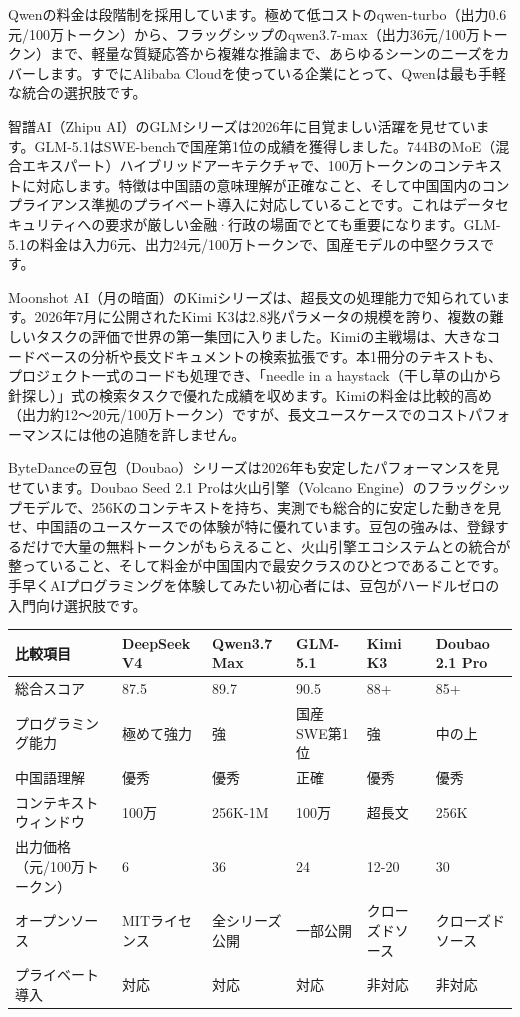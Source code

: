 Qwenの料金は段階制を採用しています。極めて低コストのqwen-turbo（出力0.6元/100万トークン）から、フラッグシップのqwen3.7-max（出力36元/100万トークン）まで、軽量な質疑応答から複雑な推論まで、あらゆるシーンのニーズをカバーします。すでにAlibaba Cloudを使っている企業にとって、Qwenは最も手軽な統合の選択肢です。


智譜AI（Zhipu AI）のGLMシリーズは2026年に目覚ましい活躍を見せています。GLM-5.1はSWE-benchで国産第1位の成績を獲得しました。744BのMoE（混合エキスパート）ハイブリッドアーキテクチャで、100万トークンのコンテキストに対応します。特徴は中国語の意味理解が正確なこと、そして中国国内のコンプライアンス準拠のプライベート導入に対応していることです。これはデータセキュリティへの要求が厳しい金融·行政の場面でとても重要になります。GLM-5.1の料金は入力6元、出力24元/100万トークンで、国産モデルの中堅クラスです。


Moonshot AI（月の暗面）のKimiシリーズは、超長文の処理能力で知られています。2026年7月に公開されたKimi K3は2.8兆パラメータの規模を誇り、複数の難しいタスクの評価で世界の第一集団に入りました。Kimiの主戦場は、大きなコードベースの分析や長文ドキュメントの検索拡張です。本1冊分のテキストも、プロジェクト一式のコードも処理でき、「needle in a haystack（干し草の山から針探し）」式の検索タスクで優れた成績を収めます。Kimiの料金は比較的高め（出力約12〜20元/100万トークン）ですが、長文ユースケースでのコストパフォーマンスには他の追随を許しません。


ByteDanceの豆包（Doubao）シリーズは2026年も安定したパフォーマンスを見せています。Doubao Seed 2.1 Proは火山引擎（Volcano Engine）のフラッグシップモデルで、256Kのコンテキストを持ち、実測でも総合的に安定した動きを見せ、中国語のユースケースでの体験が特に優れています。豆包の強みは、登録するだけで大量の無料トークンがもらえること、火山引擎エコシステムとの統合が整っていること、そして料金が中国国内で最安クラスのひとつであることです。手早くAIプログラミングを体験してみたい初心者には、豆包がハードルゼロの入門向け選択肢です。

\begin{center}
\begin{tabularx}{\linewidth}{|X|X|X|X|X|X|}
\hline
\textbf{比較項目} & \textbf{DeepSeek V4} & \textbf{Qwen3.7 Max} & \textbf{GLM-5.1} & \textbf{Kimi K3} & \textbf{Doubao 2.1 Pro} \tabularnewline
\hline
総合スコア & 87.5 & 89.7 & 90.5 & 88+ & 85+ \tabularnewline
プログラミング能力 & 極めて強力 & 強 & 国産SWE第1位 & 強 & 中の上 \tabularnewline
中国語理解 & 優秀 & 優秀 & 正確 & 優秀 & 優秀 \tabularnewline
コンテキストウィンドウ & 100万 & 256K-1M & 100万 & 超長文 & 256K \tabularnewline
出力価格（元/100万トークン） & 6 & 36 & 24 & 12-20 & 30 \tabularnewline
オープンソース & MITライセンス & 全シリーズ公開 & 一部公開 & クローズドソース & クローズドソース \tabularnewline
プライベート導入 & 対応 & 対応 & 対応 & 非対応 & 非対応 \tabularnewline
\hline
\end{tabularx}
\end{center}

